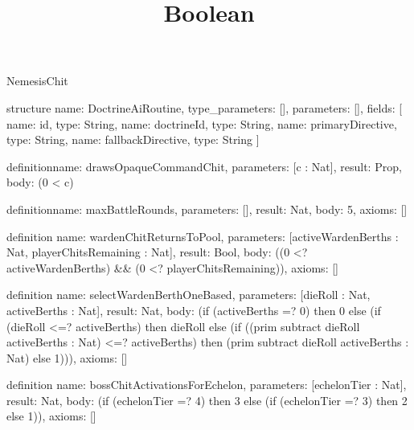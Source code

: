 \begin{lexlean}{NemesisChit}
\title{Boolean}
\begin{semanticmodule}
structure{
  name: DoctrineAiRoutine,
  type_parameters: [],
  parameters: [],
  fields: [
    {name: id, type: String},
    {name: doctrineId, type: String},
    {name: primaryDirective, type: String},
    {name: fallbackDirective, type: String}
  ]
}

definition{name: drawsOpaqueCommandChit, parameters: [c : Nat], result: Prop, body: (0 < c)}

definition{name: maxBattleRounds, parameters: [], result: Nat, body: 5, axioms: []}

definition{
  name: wardenChitReturnsToPool,
  parameters: [activeWardenBerths : Nat, playerChitsRemaining : Nat],
  result: Bool,
  body: ((0 <? activeWardenBerths) && (0 <? playerChitsRemaining)),
  axioms: []
}

definition{
  name: selectWardenBerthOneBased,
  parameters: [dieRoll : Nat, activeBerths : Nat],
  result: Nat,
  body: (if (activeBerths =? 0) then 0 else (if (dieRoll <=? activeBerths) then dieRoll else (if ((prim subtract dieRoll activeBerths : Nat) <=? activeBerths) then (prim subtract dieRoll activeBerths : Nat) else 1))),
  axioms: []
}

definition{
  name: bossChitActivationsForEchelon,
  parameters: [echelonTier : Nat],
  result: Nat,
  body: (if (echelonTier =? 4) then 3 else (if (echelonTier =? 3) then 2 else 1)),
  axioms: []
}


\end{semanticmodule}
\end{lexlean}
